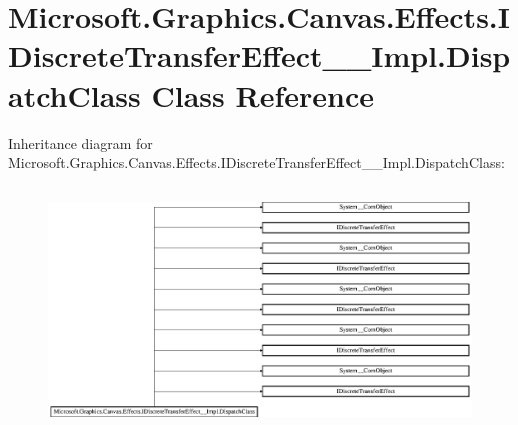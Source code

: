 \hypertarget{class_microsoft_1_1_graphics_1_1_canvas_1_1_effects_1_1_i_discrete_transfer_effect_____impl_1_1_dispatch_class}{}\section{Microsoft.\+Graphics.\+Canvas.\+Effects.\+I\+Discrete\+Transfer\+Effect\+\_\+\+\_\+\+Impl.\+Dispatch\+Class Class Reference}
\label{class_microsoft_1_1_graphics_1_1_canvas_1_1_effects_1_1_i_discrete_transfer_effect_____impl_1_1_dispatch_class}
Inheritance diagram for Microsoft.\+Graphics.\+Canvas.\+Effects.\+I\+Discrete\+Transfer\+Effect\+\_\+\+\_\+\+Impl.\+Dispatch\+Class\+:\begin{figure}[H]
\begin{center}
\leavevmode
\includegraphics[height=6.511628cm]{class_microsoft_1_1_graphics_1_1_canvas_1_1_effects_1_1_i_discrete_transfer_effect_____impl_1_1_dispatch_class}
\end{center}
\end{figure}

